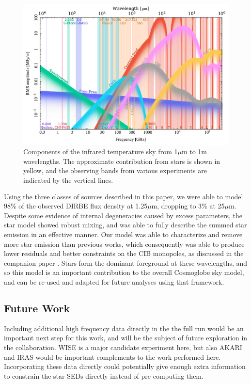 \documentclass{aa}
\begin{document}
\begin{figure}
  \centering
  \includegraphics[width=\textwidth]{figs/sed/cg_spec.pdf}
  \caption{Components of the infrared temperature sky from 1$\mu$m to 1m wavelengths. The approximate contribution from stars is shown in yellow, and the observing bands from various experiments are indicated by the vertical lines.}
  \label{fig:sed}
\end{figure}

Using the three classes of sources described in this paper, we were able to model 98\% of the observed DIRBE flux density at 1.25$\mu$m, dropping to 3\% at 25$\mu$m. Despite some evidence of internal degeneracies caused by excess parameters, the star model showed robust mixing, and was able to fully describe the summed star emission in an effective manner. Our model was able to characterize and remove more star emission than previous works, which consequently was able to produce lower residuals and better constraints on the CIB monopoles, as discussed in the companion paper \citet{CG02_03}. Stars form the dominant foreground at these wavelengths, and so this model is an important contribution to the overall Cosmoglobe sky model, and can be re-used and adapted for future analyses using that framework.

\subsection{Future Work}

Including additional high frequency data directly in the the full run would be an important next step for this work, and will be the subject of future exploration in the collaboration. WISE is a major candidate experiment here, but also   AKARI \citep{akari} and IRAS \citep{iras} would be important complements to the work performed here. Incorporating these data directly could potentially give enough extra information to constrain the star SEDs directly instead of pre-computing them.
\end{document}
